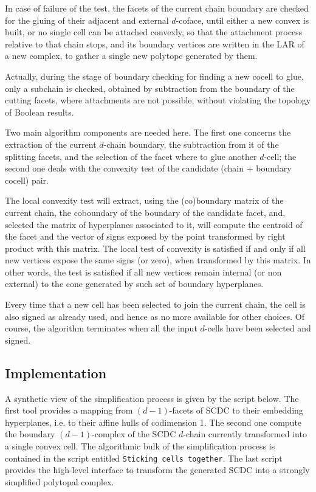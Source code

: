 \documentclass[11pt,oneside]{article}	%
\begin{document}
In case of failure of the test, the facets of the current chain boundary are checked for the gluing of their adjacent and external $d$-coface, until either a new convex is built, or no single cell can be attached convexly, so that the attachment process relative to that chain stops, and its boundary vertices are written in the LAR of a new complex, to gather a single new polytope generated by them. 

Actually, during the stage of boundary checking for finding a new cocell to glue, only a subchain is checked, obtained by subtraction from the boundary of the cutting facets, where attachments are not possible, without
violating the topology of Boolean results. 

Two main algorithm components are needed here. The first one concerns the extraction of the current $d$-chain boundary, the subtraction from it of the splitting facets, and the selection of the facet where to glue another $d$-cell; the second one deals with the convexity test of the candidate (chain $+$ boundary cocell) pair.

The local convexity test will extract, using the (co)boundary matrix of the current chain, the coboundary of the boundary of the candidate facet, and, selected the matrix of hyperplanes associated to it, will compute the centroid of the facet and the vector of signs exposed by the point transformed by right product with this matrix. The local test of convexity is satisfied if and only if all new vertices expose the same signs (or zero), when transformed by this matrix. In other words, the test is satisfied  if all new vertices remain internal (or non external) to the cone generated by such set of boundary hyperplanes.

Every time that a new cell has been selected to join the current chain, the cell is also signed as already used, and hence as no more available for other choices. Of course, the algorithm terminates when all the input  $d$-cells have been selected and signed.


\subsection{Implementation}
A synthetic view of the simplification process is given by the script below.
The first tool provides a mapping from $(d-1)$-facets of SCDC to their embedding hyperplanes, i.e. to their affine hulls of codimension 1. The second one compute the boundary $(d-1)$-complex of the SCDC $d$-chain currently transformed into a single convex cell. The algorithmic bulk of the simplification process is contained in the script entitled \texttt{Sticking cells together}. The last script provides the high-level interface to transform the generated SCDC into a strongly simplified polytopal complex.
\end{document}
